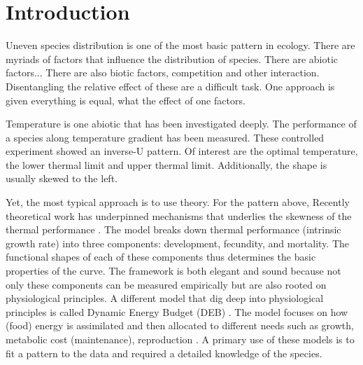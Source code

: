 \section*{Introduction}
 Uneven species distribution is one of the most basic pattern in ecology.
There are myriads of factors that influence the distribution of species.
There are abiotic factors...
There are also biotic factors, competition and other interaction.
Disentangling the relative effect of these are a difficult task.
One approach is given everything is equal, what the effect of one factors.

Temperature is one abiotic that has been investigated deeply.
The performance of a species along temperature gradient has been measured.
These controlled experiment showed an inverse-U pattern.
Of interest are the optimal temperature, the lower thermal limit and upper thermal limit.
Additionally,  the shape is usually skewed to the left.

Yet, the most typical approach is to use theory.
For the pattern above, 
Recently theoretical work has underpinned mechanisms that underlies the skewness of the thermal performance \citep{Amarasekare2012}.
The model  breaks down thermal performance (intrinsic growth rate)  into three components: development, fecundity, and mortality.
The functional shapes of each of these components thus determines the basic properties of the curve.
The framework is both elegant and sound because not only these components can be measured empirically but are also rooted on physiological principles.
A different model that dig deep into physiological principles is called Dynamic Energy Budget (DEB) \citep{Kooijman2009}.
The model focuses on how (food) energy is assimilated and then allocated to different needs such as growth, metabolic cost (maintenance), reproduction \citep{Kooijman2009}.
A primary use of  these models is to fit a pattern to the data and required a detailed knowledge of the species.  

